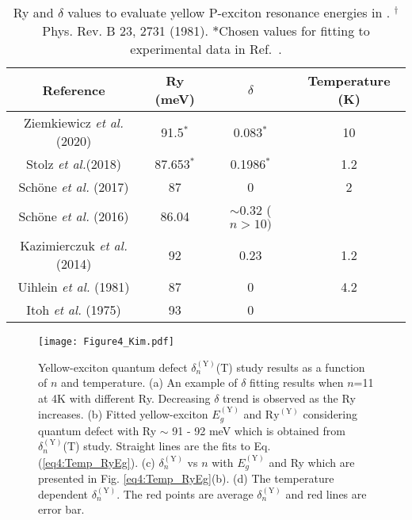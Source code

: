 \documentclass[aps,reprint,amsmath,amssymb,prb]{revtex4-1}
\begin{document}
\begin{table*}[htbp]
   \caption{Ry and $\delta$ values to evaluate yellow P-exciton resonance energies in . $^\dagger$Phys. Rev. B 23, 2731 (1981).  $\ast$Chosen values for fitting to experimental data in Ref.~\cite{Kazimierczuk2014}.}
    \label{tab3:RyQDFsurvey}
      \begin{ruledtabular}
  
    \begin{tabular}{cccc}
        Reference & Ry (meV) & $\delta$ & Temperature (K) \\  
        \hline
        Ziemkiewicz {\it{et al.}} (2020)\textsuperscript{\cite{Ziemkiewicz2020}} & 91.5$^\ast$ & 0.083$^\ast$ & 10 \\
        Stolz {\it{et al.}}(2018)\textsuperscript{\cite{Stolz2018}} & 87.653$^\ast$ & 0.1986$^\ast$ & 1.2  \\ 
        Sch\"one {\it{et al.}} (2017) \textsuperscript{\cite{Schone2017}} & 87 &  0 & 2  \\
        Schöne {\it{et al.}} (2016)\textsuperscript{\cite{Schone2016QD}} & 86.04 & $\sim$0.32 ($n > 10)$ &   \\ 
        Kazimierczuk {\it{et al.}} (2014)\textsuperscript{\cite{Kazimierczuk2014}} & 92  & 0.23 & 1.2 \\  
        Uihlein {\it{et al.}} (1981)\textsuperscript{\cite{Uihlein1981}}& 87 & 0  & 4.2 \\ 
        Itoh {\it{et al.}} (1975)\textsuperscript{\cite{Itoh1975}} & 93 & 0 &  \\ 
         \end{tabular}
    \end{ruledtabular}
\end{table*}

\begin{figure}[htbp]
\centering
\texttt{[image: Figure4\_Kim.pdf]}
\caption{Yellow-exciton quantum defect $\delta_n^{(\text{Y})}$(T) study results as a function of $n$ and temperature. (a) An example of $\delta$ fitting results when $n$=11 at 4K with different Ry. Decreasing $\delta$ trend is observed as the Ry increases. (b) Fitted yellow-exciton $E_g^{(\text{Y})}$ and $\text{Ry}^{(\text{Y})}$ considering quantum defect with Ry $\sim$ 91 - 92 meV which is obtained from $\delta_n^{(\text{Y})}$(T) study. Straight lines are the fits to Eq. (\ref{eq4:Temp_RyEg}). (c) $\delta_n^{(\text{Y})}$ vs $n$ with $E_g^{(\text{Y})}$ and Ry which are presented in Fig. \ref{eq4:Temp_RyEg}(b). (d) The temperature dependent $\delta_n^{(\text{Y})}$. The red points are average $\delta_n^{(\text{Y})}$ and red lines are error bar.}
\label{Fig4:qdf}
\end{figure}
\end{document}
